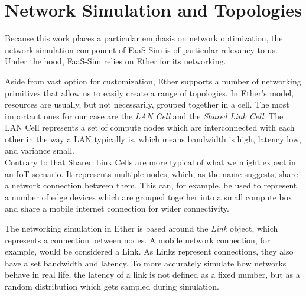 \section{Network Simulation and Topologies}
Because this work places a particular emphasis on network optimization, the network simulation component of FaaS-Sim is of particular relevancy to us.
Under the hood, FaaS-Sim relies on Ether\cite{rausch-ether} for its networking.

Aside from vast option for customization, Ether supports a number of networking primitives that allow us to easily create a range of topologies.
In Ether's model, resources are usually, but not necessarily, grouped together in a cell.
The most important ones for our case are the \textit{LAN Cell} and the \textit{Shared Link Cell}.
The LAN Cell represents a set of compute nodes which are interconnected with each other in the way a LAN typically is, which means bandwidth is high, latency low, and variance small.\\
Contrary to that Shared Link Cells are more typical of what we might expect in an IoT scenario. 
It represents multiple nodes, which, as the name suggests, share a network connection between them.
This can, for example, be used to represent a number of edge devices which are grouped together into a small compute box and share a mobile internet connection for wider connectivity.

The networking simulation in Ether is based around the \textit{Link} object\cite{rausch-ether}, which represents a connection between nodes.
A mobile network connection, for example, would be considered a Link.
As Links represent connections, they also have a set bandwidth and latency.
To more accurately simulate how networks behave in real life, the latency of a link is not defined as a fixed number, but as a random distribution which gets sampled during simulation.



